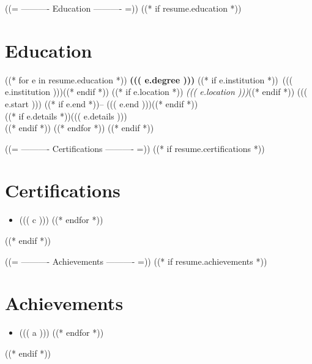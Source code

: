 \documentclass[11pt,a4paper]{article}
\begin{document}
((= ---------- Education ---------- =))
((* if resume.education *))
\section{Education}
((* for e in resume.education *))
\textbf{((( e.degree )))} ((* if e.institution *))\textbar\ ((( e.institution )))((* endif *))
((* if e.location *)) \textit{((( e.location )))}((* endif *))
\hfill ((( e.start ))) ((* if e.end *))-- ((( e.end )))((* endif *))\\
((* if e.details *))((( e.details )))\\((* endif *))
((* endfor *))
((* endif *))

((= ---------- Certifications ---------- =))
((* if resume.certifications *))
\section{Certifications}
\begin{itemize}
((* for c in resume.certifications *))
  \item ((( c )))
((* endfor *))
\end{itemize}
((* endif *))

((= ---------- Achievements ---------- =))
((* if resume.achievements *))
\section{Achievements}
\begin{itemize}
((* for a in resume.achievements *))
  \item ((( a )))
((* endfor *))
\end{itemize}
((* endif *))
\end{document}

